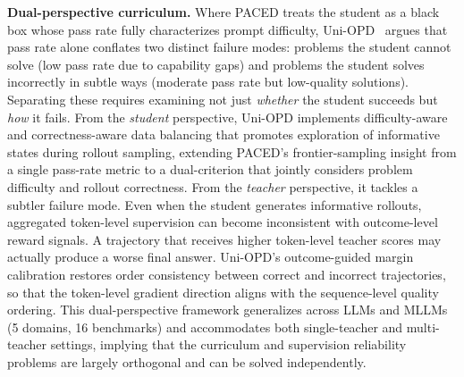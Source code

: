 \documentclass{article} %
\begin{document}
\textbf{Dual-perspective curriculum.} Where PACED treats the student as a black box whose pass rate fully characterizes prompt difficulty, Uni-OPD~\citep{2605.03677} argues that pass rate alone conflates two distinct failure modes: problems the student cannot solve (low pass rate due to capability gaps) and problems the student solves incorrectly in subtle ways (moderate pass rate but low-quality solutions). Separating these requires examining not just \emph{whether} the student succeeds but \emph{how} it fails. From the \emph{student} perspective, Uni-OPD implements difficulty-aware and correctness-aware data balancing that promotes exploration of informative states during rollout sampling, extending PACED's frontier-sampling insight from a single pass-rate metric to a dual-criterion that jointly considers problem difficulty and rollout correctness. From the \emph{teacher} perspective, it tackles a subtler failure mode. Even when the student generates informative rollouts, aggregated token-level supervision can become inconsistent with outcome-level reward signals. A trajectory that receives higher token-level teacher scores may actually produce a worse final answer. Uni-OPD's outcome-guided margin calibration restores order consistency between correct and incorrect trajectories, so that the token-level gradient direction aligns with the sequence-level quality ordering. This dual-perspective framework generalizes across LLMs and MLLMs (5 domains, 16 benchmarks) and accommodates both single-teacher and multi-teacher settings, implying that the curriculum and supervision reliability problems are largely orthogonal and can be solved independently.
\end{document}
